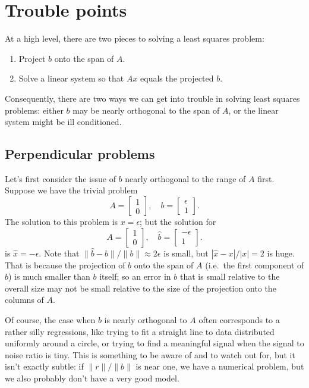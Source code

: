 \documentclass[12pt, leqno]{article} %
\begin{document}

\section{Trouble points}

At a high level, there are two pieces to solving a least squares
problem:
\begin{enumerate}
\item Project $b$ onto the span of $A$.
\item Solve a linear system so that $Ax$ equals the projected $b$.
\end{enumerate}
Consequently, there are two ways we can get into trouble in solving
least squares problems: either $b$ may be nearly orthogonal to the
span of $A$, or the linear system might be ill conditioned.


\subsection{Perpendicular problems}

Let's first consider the issue of $b$ nearly orthogonal to the
range of $A$ first.  Suppose we have the trivial problem
\[
A = \begin{bmatrix} 1 \\ 0 \end{bmatrix}, \quad
b = \begin{bmatrix} \epsilon \\ 1 \end{bmatrix}.
\]
The solution to this problem is $x = \epsilon$; but the solution for
\[
A = \begin{bmatrix} 1 \\ 0 \end{bmatrix}, \quad
\hat b = \begin{bmatrix} -\epsilon \\ 1 \end{bmatrix}.
\]
is $\hat x = -\epsilon$.  Note that $\|\hat b-b\|/\|b\| \approx 2
\epsilon$ is small, but $|\hat x - x|/|x| = 2$ is huge.  That is
because the projection of $b$ onto the span of $A$ (i.e.~the first
component of $b$) is much smaller than $b$ itself; so an error in $b$
that is small relative to the overall size may not be small relative
to the size of the projection onto the columns of $A$.

Of course, the case when $b$ is nearly orthogonal to $A$ often
corresponds to a rather silly regressions, like trying to fit a
straight line to data distributed uniformly around a circle, or trying
to find a meaningful signal when the signal to noise ratio is tiny.
This is something to be aware of and to watch out for, but it isn't
exactly subtle: if $\|r\|/\|b\|$ is near one, we have a numerical
problem, but we also probably don't have a very good model.
\end{document}
